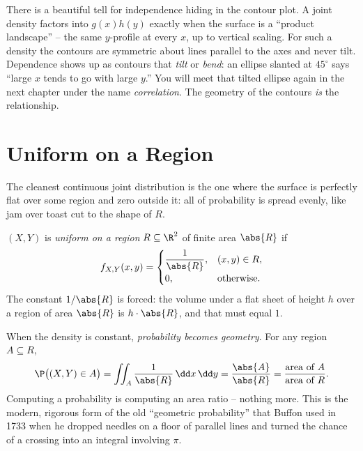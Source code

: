 \begin{aestheticbox}
There is a beautiful tell for independence hiding in the contour plot. A joint
density factors into $g(x)h(y)$ exactly when the surface is a
``product landscape'' -- the same $y$-profile at every $x$, up to vertical
scaling. For such a density the contours are symmetric about lines parallel to the
axes and never tilt. Dependence shows up as contours that \emph{tilt} or
\emph{bend}: an ellipse
slanted at $45^\circ$ says ``large $x$ tends to go with large $y$.'' You will
meet that tilted ellipse again in the next chapter under the name
\emph{correlation}. The geometry of the contours \emph{is} the relationship.
\end{aestheticbox}

\section{Uniform on a Region}
\label{ch13:uniform}

The cleanest continuous joint distribution is the one where the surface is
perfectly flat over some region and zero outside it: all of probability is spread
evenly, like jam over toast cut to the shape of $R$.

\begin{definition}
\label{ch13:def-uniform}
$(X,Y)$ is \emph{uniform on a region} $R\subseteq\R^2$ of finite area
$\abs{R}$ if
\[
  f_{X,Y}(x,y) =
  \begin{cases}
    \dfrac{1}{\abs{R}}, & (x,y)\in R,\\[1.2ex]
    0, & \text{otherwise.}
  \end{cases}
\]
The constant $1/\abs{R}$ is forced: the volume under a flat sheet of height $h$
over a region of area $\abs{R}$ is $h\cdot\abs{R}$, and that must equal $1$.
\end{definition}

\begin{happeningbox}
When the density is constant, \emph{probability becomes geometry}. For any region
$A\subseteq R$,
\[
  \P\big((X,Y)\in A\big) = \iint_A \frac{1}{\abs{R}}\,\dd x\,\dd y
  = \frac{\abs{A}}{\abs{R}} = \frac{\text{area of } A}{\text{area of } R}.
\]
Computing a probability is computing an area ratio -- nothing more. This is the
modern, rigorous form of the old ``geometric probability'' that Buffon used in
1733 when he dropped needles on a floor of parallel lines and turned the chance
of a crossing into an integral involving $\pi$.
\end{happeningbox}


